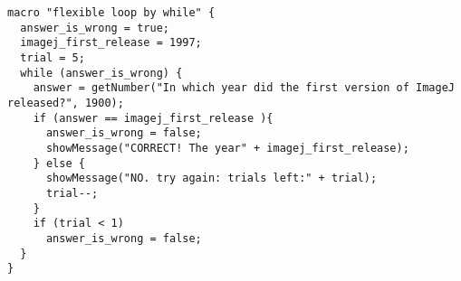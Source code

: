 \begin{lstlisting}[morekeywords={*, while}]
macro "flexible loop by while" {
  answer_is_wrong = true;
  imagej_first_release = 1997;
  trial = 5;
  while (answer_is_wrong) {
    answer = getNumber("In which year did the first version of ImageJ released?", 1900);
    if (answer == imagej_first_release ){
      answer_is_wrong = false;
      showMessage("CORRECT! The year" + imagej_first_release);		
    } else {
      showMessage("NO. try again: trials left:" + trial);
      trial--;
    }
    if (trial < 1)
      answer_is_wrong = false;
  }
}

\end{lstlisting}